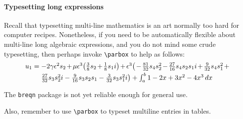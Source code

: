 \documentclass[20pt,a4paper]{extarticle}
\begin{document}
\paragraph{Typesetting long expressions}
Recall that typesetting multi-line mathematics is an art normally too hard for computer recipes.  Nonetheless, if you need to be automatically flexible about multi-line long algebraic expressions, and you do not mind some crude typesetting, then perhaps invoke \verb|\parbox| to help as follows: 
\newcommand{\parmath}[2][0.8\linewidth]{\parbox[t]{#1}%
    {\raggedright\linespread{1.4}\selectfont\(#2\)}}
\[
u_1=\parmath{ -2 \gamma  \epsilon^{2} s_{2}+\mu  \epsilon^{3} \big( \frac{3}{8} s_{2}+\frac{1}{8} s_{1} i\big)+\epsilon^{3} \big( -\frac{81}{32} s_{4} s_{2}^{2}-\frac{27}{16} s_{4} s_{2} s_{1} i+\frac{9}{32} s_{4} s_{1}^{2}+\frac{27}{32} s_{3} s_{2}^{2} i-\frac{9}{16} s_{3} s_{2} s_{1}-\frac{3}{32} s_{3} s_{1}^{2} i\big) +\int_a^b 1-2x+3x^2-4x^3\,dx }
\]

The \verb|breqn| package is not yet reliable enough for general use.

Also, remember to use \verb|\parbox| to typeset multiline entries in tables.
\end{document}
